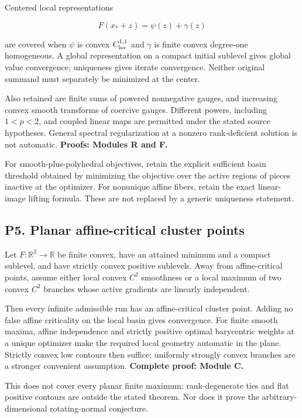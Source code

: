 \documentclass[10pt,oneside,openany]{book}
\theoremstyle{remark}\newtheorem{remark}{Remark}[chapter]
\begin{document}
Centered local representations

\[F(x_*+z)=\psi(z)+\gamma(z)\]

are covered when \(\psi\) is convex \(C^{1,1}_{\rm loc}\) and \(\gamma\) is finite convex degree-one homogeneous. A global representation on a compact initial sublevel gives global value convergence; uniqueness gives iterate convergence. Neither original summand must separately be minimized at the center.

Also retained are finite sums of powered nonnegative gauges, and increasing convex smooth transforms of coercive gauges. Different powers, including \(1<p<2\), and coupled linear maps are permitted under the stated source hypotheses. General spectral regularization at a nonzero rank-deficient solution is not automatic. \textbf{Proofs: Modules R and F.}

For smooth-plus-polyhedral objectives, retain the explicit sufficient basin threshold obtained by minimizing the objective over the active regions of pieces inactive at the optimizer. For nonunique affine fibers, retain the exact linear-image lifting formula. These are not replaced by a generic uniqueness statement.

\subsection{P5. Planar affine-critical cluster points}\label{p5.-planar-affine-critical-cluster-points}

Let \(F:\mathbb R^2\to\mathbb R\) be finite convex, have an attained minimum and a compact sublevel, and have strictly convex positive sublevels. Away from affine-critical points, assume either local convex \(C^2\) smoothness or a local maximum of two convex \(C^2\) branches whose active gradients are linearly independent.

Then every infinite admissible run has an affine-critical cluster point. Adding no false affine criticality on the local basin gives convergence. For finite smooth maxima, affine independence and strictly positive optimal barycentric weights at a unique optimizer make the required local geometry automatic in the plane. Strictly convex low contours then suffice; uniformly strongly convex branches are a stronger convenient assumption. \textbf{Complete proof: Module C.}

This does not cover every planar finite maximum: rank-degenerate ties and flat positive contours are outside the stated theorem. Nor does it prove the arbitrary-dimensional rotating-normal conjecture.
\end{document}
